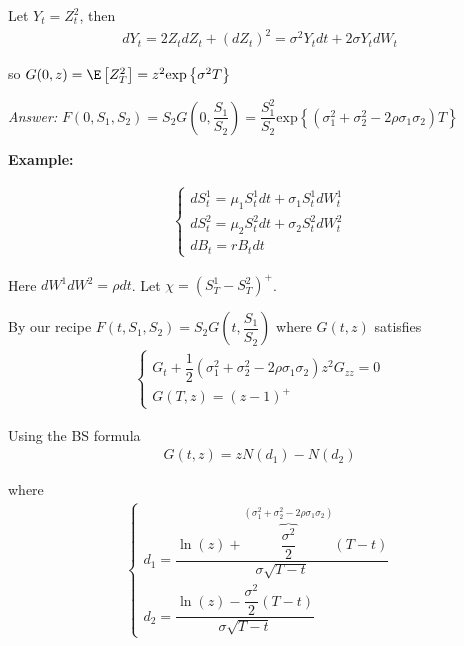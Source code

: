 \noindent Let $Y_t = Z_t^2$, then 
\begin{equation*}
  \begin{gathered}
    dY_t = 2Z_tdZ_t+(dZ_t)^2=\sigma^2Y_tdt+2\sigma Y_tdW_t
  \end{gathered}
\end{equation*}\par
\noindent so $G(0,z) = \E\left[Z_T^2\right] = z^2\text{exp}\left\{\sigma^2T\right\}$
\par\bigskip
\noindent\textit{Answer:} $F(0,S_1,S_2) = S_2G\left(0,\dfrac{S_1}{S_2}\right) = \dfrac{S_1^2}{S_2}\text{exp}\left\{\left(\sigma_1^2+\sigma_2^2-2\rho\sigma_1\sigma_2\right)T\right\}$
\par\bigskip
\noindent\textbf{Example:}\par
\begin{equation*}
  \begin{gathered}
    \begin{cases}
      dS_t^1 = \mu_1S_t^1dt+\sigma_1S_t^1dW_t^1\\
      dS_t^2=\mu_2S_t^2dt+\sigma_2S_t^2dW_t^2\\
      dB_t = rB_tdt
    \end{cases}
  \end{gathered}
\end{equation*}\par
\noindent Here $dW^1dW^2  = \rho dt$. Let $\chi = \left(S_T^1-S_T^2\right)^+$.\par
\noindent By our recipe $F(t,S_1,S_2) = S_2G\left(t,\dfrac{S_1}{S_2}\right)$ where $G(t,z)$ satisfies
\begin{equation*}
  \begin{gathered}
    \begin{cases}
      G_t+\dfrac{1}{2}\left(\sigma_1^2+\sigma_2^2-2\rho\sigma_1\sigma_2\right)z^2G_{zz}=0\\
      G(T,z) = (z-1)^+
    \end{cases}
  \end{gathered}
\end{equation*}\par
\noindent Using the BS formula
\begin{equation*}
  \begin{gathered}
    G(t,z) = zN(d_1)-N(d_2)
  \end{gathered}
\end{equation*}\par
\noindent where 
\begin{equation*}
  \begin{gathered}
    \begin{cases}
      d_1 = \dfrac{\ln{\left(z\right)}+\overbrace{\dfrac{\sigma^2}{2}}^{\left(\sigma_1^2+\sigma_2^2-2\rho\sigma_1\sigma_2\right)}(T-t)}{\sigma\sqrt{T-t}}\\
      d_2 = \dfrac{\ln{\left(z\right)}-\dfrac{\sigma^2}{2}(T-t)}{\sigma\sqrt{T-t}}
    \end{cases}
  \end{gathered}
\end{equation*}\par
